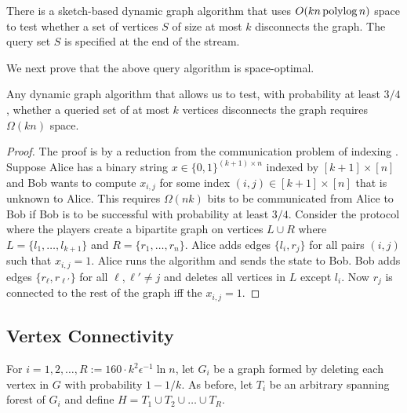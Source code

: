 \begin{theorem}
There is a sketch-based dynamic graph algorithm that uses $O(kn \operatorname{polylog} n)$ space to test whether a set of vertices $S$ of size at most $k$ disconnects the graph. The query set $S$ is specified at the end of the stream.
\end{theorem}

We next prove that the above query algorithm is space-optimal.

\begin{theorem}
Any dynamic graph algorithm that allows us to test, with probability at least $3/4$, whether a queried set of at most $k$ vertices disconnects the graph requires $\Omega(kn)$ space.
\end{theorem}
\begin{proof}
The proof is by a reduction from the communication problem of indexing \cite{Ablayev96}. Suppose Alice has a binary string $x\in \{0,1\}^{(k+1)\times n}$ indexed by $[k+1]\times [n]$ and Bob wants to compute $x_{i,j}$ for some  index $(i,j)\in [k+1]\times [n]$ that is unknown to Alice. This requires $\Omega(nk)$ bits to be communicated from Alice to Bob if Bob is to be successful with probability at least $3/4$. Consider the protocol where the players create a bipartite graph on vertices $L\cup R$ where $L=\{l_1, \ldots, l_{k+1}\}$ and $R=\{r_1, \ldots, r_n\}$. Alice adds edges $\{l_i,r_j\}$ for all pairs $(i,j)$ such that $x_{i,j}=1$. 
Alice runs the algorithm and sends the state to Bob. Bob adds edges $\{r_\ell,r_{\ell'}\}$ for all $\ell,\ell'\neq j$ and deletes all vertices in $L$ except $l_i$. Now $r_j$ is connected to the rest of the graph iff the $x_{i,j}=1$.
\end{proof}


\subsection{Vertex Connectivity}

For $i=1,2,\ldots, R:=160\cdot k^2 \epsilon^{-1}  \ln n$, let $G_i$ be a graph formed by deleting each vertex in $G$ with probability $1-1/k$. As before, let $T_i$ be an arbitrary spanning forest of $G_i$ and define $H=T_1\cup T_2 \cup \ldots \cup T_R$.


